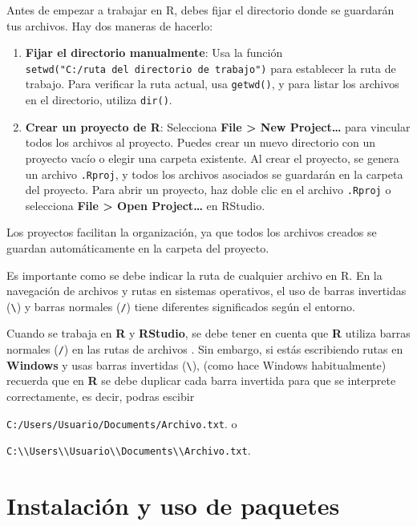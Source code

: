 \documentclass[
  letterpaper,
]{scrbook}
\begin{document}
Antes de empezar a trabajar en R, debes fijar el directorio donde se
guardarán tus archivos. Hay dos maneras de hacerlo:

\begin{enumerate}
\def\labelenumi{\arabic{enumi}.}
\item
  \textbf{Fijar el directorio manualmente}: Usa la función
  \texttt{setwd("C:/ruta\ del\ directorio\ de\ trabajo")} para
  establecer la ruta de trabajo. Para verificar la ruta actual, usa
  \texttt{getwd()}, y para listar los archivos en el directorio, utiliza
  \texttt{dir()}.
\item
  \textbf{Crear un proyecto de R}: Selecciona \textbf{File
  \textgreater{} New Project\ldots{}} para vincular todos los archivos
  al proyecto. Puedes crear un nuevo directorio con un proyecto vacío o
  elegir una carpeta existente. Al crear el proyecto, se genera un
  archivo \texttt{.Rproj}, y todos los archivos asociados se guardarán
  en la carpeta del proyecto. Para abrir un proyecto, haz doble clic en
  el archivo \texttt{.Rproj} o selecciona \textbf{File \textgreater{}
  Open Project\ldots{}} en RStudio.
\end{enumerate}

Los proyectos facilitan la organización, ya que todos los archivos
creados se guardan automáticamente en la carpeta del proyecto.

Es importante como se debe indicar la ruta de cualquier archivo en R. En
la navegación de archivos y rutas en sistemas operativos, el uso de
barras invertidas (\texttt{\textbackslash{}}) y barras normales
(\texttt{/}) tiene diferentes significados según el entorno.

Cuando se trabaja en \textbf{R} y \textbf{RStudio}, se debe tener en
cuenta que \textbf{R} utiliza barras normales (\texttt{/}) en las rutas
de archivos . Sin embargo, si estás escribiendo rutas en
\textbf{Windows} y usas barras invertidas (\texttt{\textbackslash{}}),
(como hace Windows habitualmente) recuerda que en \textbf{R} se debe
duplicar cada barra invertida para que se interprete correctamente, es
decir, podras escibir

\texttt{C:/Users/Usuario/Documents/Archivo.txt}. o

\texttt{C:\textbackslash{}\textbackslash{}Users\textbackslash{}\textbackslash{}Usuario\textbackslash{}\textbackslash{}Documents\textbackslash{}\textbackslash{}Archivo.txt}.

\hypertarget{instalaciuxf3n-y-uso-de-paquetes}{%
\section{Instalación y uso de
paquetes}\label{instalaciuxf3n-y-uso-de-paquetes}}
\end{document}
